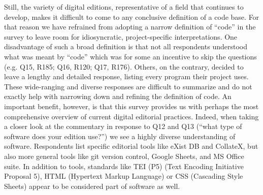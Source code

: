 \begin{paper}
Still, the variety of digital editions, representative of a field that
continues to develop, makes it difficult to come to any conclusive
definition of a code base. For that reason we have refrained from
adopting a narrow definition of ``code'' in the survey to leave room for
idiosyncratic, project-specific interpretations. One disadvantage of
such a broad definition is that not all respondents understood what was
meant by ``code'' which was for some an incentive to skip the questions
(e.g. Q15, R185; Q16, R120; Q17, R176). Others, on the contrary, decided
to leave a lengthy and detailed response, listing every program their
project uses. These wide-ranging and diverse responses are difficult to
summarize and do not exactly help with narrowing down and refining the
definition of code. An important benefit, however, is that this survey
provides us with perhaps the most comprehensive overview of current
digital editorial practices. Indeed, when taking a closer look at the
commentary in response to Q12 and Q13 (``what type of software does your edition
use?'') we see a highly diverse understanding of software. Respondents
list specific editorial tools like eXist DB and CollateX, but also more
general tools like git version control, Google Sheets, and MS Office
suite. In addition to tools, standards like TEI (P5) (Text Encoding
Initiative Proposal 5), HTML (Hypertext Markup Language) or CSS
(Cascading Style Sheets) appear to be considered part of software as
well.


\end{paper}
